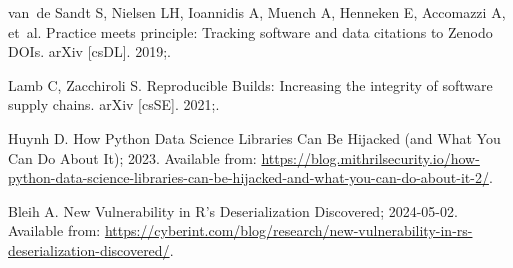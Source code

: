 \documentclass[11pt]{article}
\begin{document}
\begin{thebibliography}{10}
van~de Sandt S, Nielsen LH, Ioannidis A, Muench A, Henneken E, Accomazzi A,
  et~al.
\newblock Practice meets principle: Tracking software and data citations to
  Zenodo DOIs.
\newblock arXiv [csDL]. 2019;.

Lamb C, Zacchiroli S.
\newblock Reproducible Builds: Increasing the integrity of software supply
  chains.
\newblock arXiv [csSE]. 2021;.

Huynh D. How Python Data Science Libraries Can Be Hijacked (and What You Can Do
  About It); 2023.
\newblock Available from:
  \url{https://blog.mithrilsecurity.io/how-python-data-science-libraries-can-be-hijacked-and-what-you-can-do-about-it-2/}.

Bleih A. New Vulnerability in {R}'s Deserialization Discovered; 2024-05-02.
\newblock Available from:
  \url{https://cyberint.com/blog/research/new-vulnerability-in-rs-deserialization-discovered/}.

\end{thebibliography}
\end{document}
